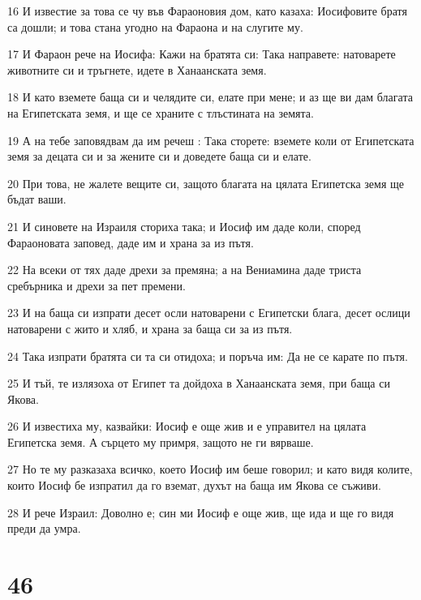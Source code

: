 \par 16 И известие за това се чу във Фараоновия дом, като казаха: Иосифовите братя са дошли; и това стана угодно на Фараона и на слугите му.
\par 17 И Фараон рече на Иосифа: Кажи на братята си: Така направете: натоварете животните си и тръгнете, идете в Ханаанската земя.
\par 18 И като вземете баща си и челядите си, елате при мене; и аз ще ви дам благата на Египетската земя, и ще се храните с тлъстината на земята.
\par 19 А на тебе заповядвам да им речеш : Така сторете: вземете коли от Египетската земя за децата си и за жените си и доведете баща си и елате.
\par 20 При това, не жалете вещите си, защото благата на цялата Египетска земя ще бъдат ваши.
\par 21 И синовете на Израиля сториха така; и Иосиф им даде коли, според Фараоновата заповед, даде им и храна за из пътя.
\par 22 На всеки от тях даде дрехи за премяна; а на Вениамина даде триста сребърника и дрехи за пет премени.
\par 23 И на баща си изпрати десет осли натоварени с Египетски блага, десет ослици натоварени с жито и хляб, и храна за баща си за из пътя.
\par 24 Така изпрати братята си та си отидоха; и поръча им: Да не се карате по пътя.
\par 25 И тъй, те излязоха от Египет та дойдоха в Ханаанската земя, при баща си Якова.
\par 26 И известиха му, казвайки: Иосиф е още жив и е управител на цялата Египетска земя. А сърцето му примря, защото не ги вярваше.
\par 27 Но те му разказаха всичко, което Иосиф им беше говорил; и като видя колите, които Иосиф бе изпратил да го вземат, духът на баща им Якова се съживи.
\par 28 И рече Израил: Доволно е; син ми Иосиф е още жив, ще ида и ще го видя преди да умра.

\chapter{46}


